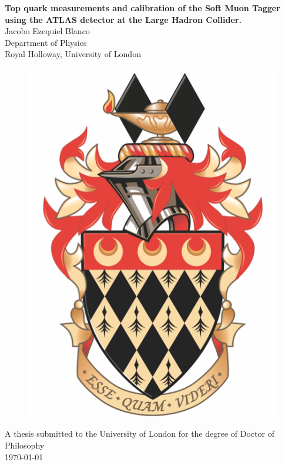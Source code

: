 \begin{titlepage}
\begin{center}
{\LARGE \textbf{Top quark measurements and calibration of the Soft Muon Tagger using the ATLAS detector at the Large Hadron Collider.\\}}
\vspace{1cm}
{\Large Jacobo Ezequiel Blanco\\}
\vspace{1cm}
{\large Department of Physics\\}
{\large Royal Holloway, University of London\\}

\begin{figure}[ht]
  \centering
  \includegraphics[width=0.3\linewidth]{BoilerPlate/Resources/RHULCrest.png}
\end{figure}

{\Large A thesis submitted to the University of London for the degree of Doctor of Philosophy\\}
\vspace{1cm}
{\today\\}
\end{center}
\end{titlepage}
